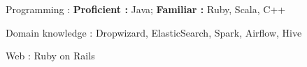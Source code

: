 


\begin{cvskills}


\cvskill
	{Programming : } 
	{\textbf{Proficient :}  Java;
	\textbf{Familiar :} Ruby, Scala, C++} 


\cvskill
	{Domain knowledge : }
	{Dropwizard, ElasticSearch, Spark, Airflow, Hive}



\cvskill
{Web : } %
{Ruby on Rails}

\end{cvskills}
